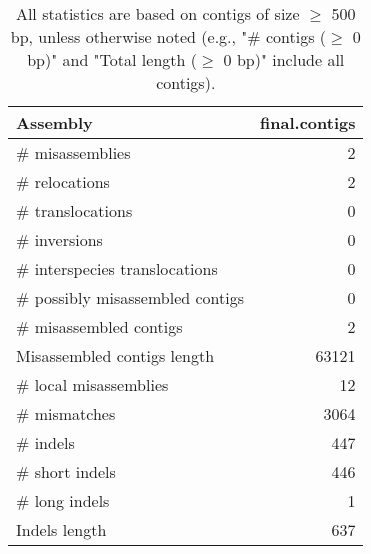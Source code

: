\documentclass[12pt,a4paper]{article}
\begin{document}
\begin{table}[ht]
\begin{center}
\caption{All statistics are based on contigs of size $\geq$ 500 bp, unless otherwise noted (e.g., "\# contigs ($\geq$ 0 bp)" and "Total length ($\geq$ 0 bp)" include all contigs).}
\begin{tabular}{|l*{1}{|r}|}
\hline
Assembly & final.contigs \\ \hline
\# misassemblies & 2 \\ \hline
\hspace{5mm}\# relocations & 2 \\ \hline
\hspace{5mm}\# translocations & 0 \\ \hline
\hspace{5mm}\# inversions & 0 \\ \hline
\hspace{5mm}\# interspecies translocations & 0 \\ \hline
\# possibly misassembled contigs & 0 \\ \hline
\# misassembled contigs & 2 \\ \hline
Misassembled contigs length & 63121 \\ \hline
\# local misassemblies & 12 \\ \hline
\# mismatches & 3064 \\ \hline
\# indels & 447 \\ \hline
\hspace{5mm}\# short indels & 446 \\ \hline
\hspace{5mm}\# long indels & 1 \\ \hline
Indels length & 637 \\ \hline
\end{tabular}
\end{center}
\end{table}
\end{document}
